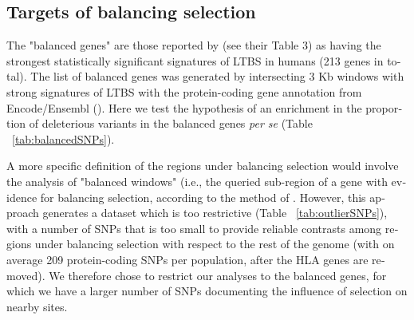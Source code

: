 \begin{refsection}
\begin{otherlanguage}{english}

\subsection{Targets of balancing selection} 


	The "balanced genes" are those reported by \textcite{Bitarello2016} (see their Table 3) as having the strongest statistically significant signatures of LTBS in humans (213 genes in total). The list of balanced genes was generated by intersecting 3 Kb windows with strong signatures of LTBS with the protein-coding gene annotation from Encode/Ensembl (\cite{Bitarello2016}). Here we test the hypothesis of an enrichment in the proportion of deleterious variants in the balanced genes \emph{per se} (Table ~\ref{tab:balancedSNPs}). 

A more specific definition of the regions under balancing selection would involve the analysis of "balanced windows" (i.e., the queried sub-region of a gene with evidence for balancing selection, according to the method of \textcite{Bitarello2016}. However, this approach generates a dataset which is too restrictive (Table ~\ref{tab:outlierSNPs}), with a number of SNPs that is too small to provide reliable contrasts among regions under balancing selection with respect to the rest of the genome  (with on average 209 protein-coding SNPs per population, after the HLA genes are removed). We therefore chose to restrict our analyses to the balanced genes, for which we have a larger number of SNPs documenting the influence of selection on nearby sites.




\end{otherlanguage}
\end{refsection}
